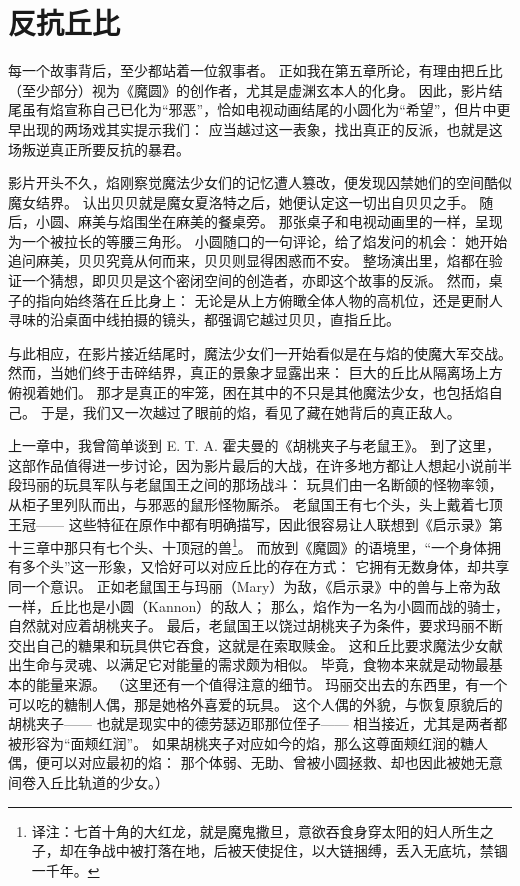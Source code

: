 \chapter{反抗丘比}
每一个故事背后，至少都站着一位叙事者。
正如我在第五章所论，有理由把丘比（至少部分）视为《魔圆》的创作者，尤其是虚渊玄本人的化身。
因此，影片结尾虽有焰宣称自己已化为“邪恶”，恰如电视动画结尾的小圆化为“希望”，但片中更早出现的两场戏其实提示我们：
应当越过这一表象，找出真正的反派，也就是这场叛逆真正所要反抗的暴君。

影片开头不久，焰刚察觉魔法少女们的记忆遭人篡改，便发现囚禁她们的空间酷似魔女结界。
认出贝贝就是魔女夏洛特之后，她便认定这一切出自贝贝之手。
随后，小圆、麻美与焰围坐在麻美的餐桌旁。
那张桌子和电视动画里的一样，呈现为一个被拉长的等腰三角形。
小圆随口的一句评论，给了焰发问的机会：
她开始追问麻美，贝贝究竟从何而来，贝贝则显得困惑而不安。
整场演出里，焰都在验证一个猜想，即贝贝是这个密闭空间的创造者，亦即这个故事的反派。
然而，桌子的指向始终落在丘比身上：
无论是从上方俯瞰全体人物的高机位，还是更耐人寻味的沿桌面中线拍摄的镜头，都强调它越过贝贝，直指丘比。

与此相应，在影片接近结尾时，魔法少女们一开始看似是在与焰的使魔大军交战。
然而，当她们终于击碎结界，真正的景象才显露出来：
巨大的丘比从隔离场上方俯视着她们。
那才是真正的牢笼，困在其中的不只是其他魔法少女，也包括焰自己。
于是，我们又一次越过了眼前的焰，看见了藏在她背后的真正敌人。

上一章中，我曾简单谈到 E. T. A. 霍夫曼的《胡桃夹子与老鼠王》。
到了这里，这部作品值得进一步讨论，因为影片最后的大战，在许多地方都让人想起小说前半段玛丽的玩具军队与老鼠国王之间的那场战斗：
玩具们由一名断颌的怪物率领，从柜子里列队而出，与邪恶的鼠形怪物厮杀。
老鼠国王有七个头，头上戴着七顶王冠——
这些特征在原作中都有明确描写，因此很容易让人联想到《启示录》第十三章中那只有七个头、十顶冠的兽\footnote{%
    译注：七首十角的大红龙，就是魔鬼撒旦，意欲吞食身穿太阳的妇人所生之子，却在争战中被打落在地，后被天使捉住，以大链捆缚，丢入无底坑，禁锢一千年。
}。
而放到《魔圆》的语境里，“一个身体拥有多个头”这一形象，又恰好可以对应丘比的存在方式：
它拥有无数身体，却共享同一个意识。
正如老鼠国王与玛丽（Mary）为敌，《启示录》中的兽与上帝为敌一样，丘比也是小圆（Kannon）的敌人；
那么，焰作为一名为小圆而战的骑士，自然就对应着胡桃夹子。
最后，老鼠国王以饶过胡桃夹子为条件，要求玛丽不断交出自己的糖果和玩具供它吞食，这就是在索取赎金。
这和丘比要求魔法少女献出生命与灵魂、以满足它对能量的需求颇为相似。
毕竟，食物本来就是动物最基本的能量来源。
（这里还有一个值得注意的细节。
玛丽交出去的东西里，有一个可以吃的糖制人偶，那是她格外喜爱的玩具。
这个人偶的外貌，与恢复原貌后的胡桃夹子——
也就是现实中的德劳瑟迈耶那位侄子——
相当接近，尤其是两者都被形容为“面颊红润”。
如果胡桃夹子对应如今的焰，那么这尊面颊红润的糖人偶，便可以对应最初的焰：
那个体弱、无助、曾被小圆拯救、却也因此被她无意间卷入丘比轨道的少女。）

